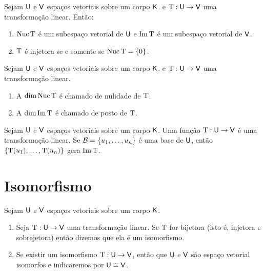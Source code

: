 \documentclass[10pt,a4paper]{book}
\begin{document}
\begin{proposition}
	Sejam $\mathsf{ U }$ e $\mathsf{ V }$ espaços vetoriais sobre um corpo $\mathsf{ K }$. e $\mathrm{ T } : \mathsf{ U } \rightarrow \mathsf{ V }$ uma transformação linear. Então:
	\begin{enumerate}
		\item $\mathrm{ Nuc }\, \mathrm{ T }$ é um subespaço vetorial de $\mathsf{ U }$ e $\mathrm{ Im }\, \mathrm{ T }$ é um subespaço vetorial de $\mathsf{ V }$.
		\item $\mathrm{ T }$ é injetora se e somente se $\mathrm{ Nuc }\, \mathrm{ T } = \{ 0 \}$.
	\end{enumerate}
\end{proposition}

\begin{definition}
	Sejam $\mathsf{ U }$ e $\mathsf{ V }$ espaços vetoriais sobre um corpo $\mathsf{ K }$. e $\mathrm{ T } : \mathsf{ U } \rightarrow \mathsf{ V }$ uma transformação linear. 
	\begin{enumerate}
		\item A $\dim \mathrm{ Nuc }\, \mathrm{ T }$ é chamado de nulidade de $\mathrm{ T }$.
		\item A $\dim \mathrm{ Im }\, \mathrm{ T }$ é chamado de posto de $\mathrm{ T }$.
	\end{enumerate}
\end{definition}

\begin{lemma}
	Sejam $\mathsf{ U }$ e $\mathsf{ V }$ espaços vetoriais sobre um corpo $\mathsf{ K }$. Uma função $\mathrm{ T } : \mathsf{ U } \rightarrow \mathsf{ V }$ é uma transformação linear. Se $\mathcal{ B } = \{ u_1, \dots, u_n \}$ é uma base de $\mathsf{ U }$, então $\{ \mathrm{ T }(u_1), \dots, \mathrm{ T }(u_n) \}$ gera $\mathrm{ Im }\, \mathrm{ T }$.
\end{lemma}




\section{Isomorfismo}
\begin{definition}
	Sejam $\mathsf{ U }$ e $\mathsf{ V }$ espaços vetoriais sobre um corpo $\mathsf{ K }$. 
	\begin{enumerate}
		\item Seja $\mathrm{ T } : \mathsf{ U } \rightarrow \mathsf{ V }$ uma transformação linear. Se $\mathrm{ T }$ for bijetora (isto é, injetora e sobrejetora) então dizemos que ela é um isomorfismo.
		\item Se existir um isomorfismo $\mathrm{ T } : \mathsf{ U } \rightarrow \mathsf{ V }$, então que $\mathsf{ U }$ e $\mathsf{ V }$ são espaço vetorial isomorfos e indicaremos por $\mathsf{ U } \cong \mathsf{ V }$.
	\end{enumerate}
\end{definition}
\end{document}
